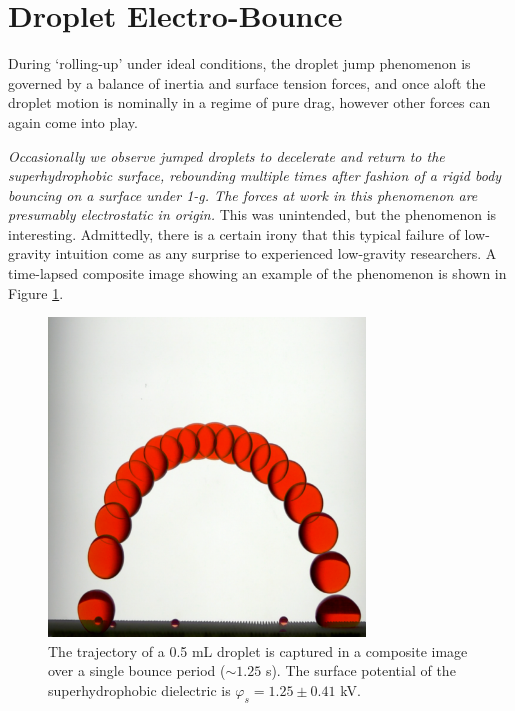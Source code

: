 \documentclass[12pt,a4paper,oneside]{book}
\begin{document}
\section{Droplet Electro-Bounce}
During `rolling-up' under ideal conditions, the droplet jump phenomenon is governed by a balance of inertia and surface tension forces, and once aloft the droplet motion is nominally in a regime of pure drag, however other forces can again come into play. 

\emph{Occasionally we observe jumped droplets to decelerate and return to the superhydrophobic surface, rebounding multiple times after fashion of a rigid body bouncing on a surface under 1-g. The forces at work in this phenomenon are presumably electrostatic in origin.} This was unintended, but the phenomenon is interesting. Admittedly, there is a certain irony that this typical failure of low-gravity intuition come as any surprise to experienced low-gravity researchers. A time-lapsed composite image showing an example of the phenomenon is shown in Figure \ref{fig:bounce}.
\begin{figure}[htb]
\centering
\includegraphics[width=0.75\textwidth]{bounce}
\caption{The trajectory of a 0.5 mL droplet is captured in a composite image over a single bounce period ($\sim 1.25$ s). The surface potential of the superhydrophobic dielectric is $\varphi_s = 1.25 \pm 0.41$ kV. \label{fig:bounce}}
\end{figure}
\end{document}
